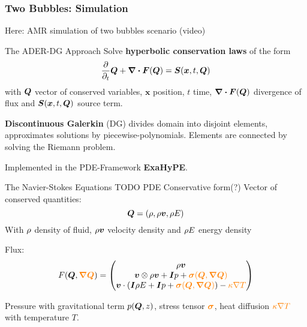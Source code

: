 \documentclass[aspectratio=169]{beamer}
\begin{document}
\begin{frame}
  \frametitle{Two Bubbles: Simulation}
  Here: AMR simulation of two bubbles scenario (video)
\end{frame}

\begin{frame}{The ADER-DG Approach}
  Solve \textbf{hyperbolic conservation laws} of the form
\begin{equation}
  \label{eq:conservation-law}
 \frac{\partial}{\partial_t}  \Q + \divergence{\flux(\Q)} = \source(\bm{x}, t, \Q)
\end{equation}
with $\bm{Q}$ vector of conserved variables, $\bm{x}$ position, $t$ time,  $\divergence{\flux(\Q)}$ divergence of flux and $\source(\bm{x}, t, \Q)$ source term.

\textbf{Discontinuous Galerkin} (\textsc{DG}) divides domain into disjoint elements, approximates solutions by piecewise-polynomials.
Elements are connected by solving the Riemann problem.


Implemented in the \textsc{PDE}-Framework \textbf{ExaHyPE}.
\end{frame}


\begin{frame}{The Navier-Stokes Equations}
  TODO PDE Conservative form(?)
  Vector of conserved quantities:
\begin{equation}
  \label{eq:conserved-variables}
 \bm{Q} = \left( \rho, \rho \bm{v}, \rho E \right) 
\end{equation}
With $\rho$ density of fluid, $\rho \bm{v}$ velocity density and $\rho E$ energy density

Flux:
\begin{equation}
  F(\Q, \textcolor{orange}{\gradQ}) = 
  \begin{pmatrix}
    \Qj \\
    \Qv  \otimes \Qj + \bm{I} \pressure + \textcolor{orange}{\stressT (\Q, \gradQ)}  \\
    \Qv \cdot \left(\bm{I} \QE + \bm{I} \pressure + \textcolor{orange}{\stressT (\Q, \gradQ)} \right) -
    \textcolor{orange}{\kappa \nabla T}
  \end{pmatrix}
\end{equation}

Pressure with gravitational term $p(\bm{Q}, z)$,
stress tensor $\textcolor{orange}{\bm{\sigma}}$, heat diffusion $\textcolor{orange}{\kappa \nabla T}$ with temperature $T$.
\end{frame}
\end{document}
